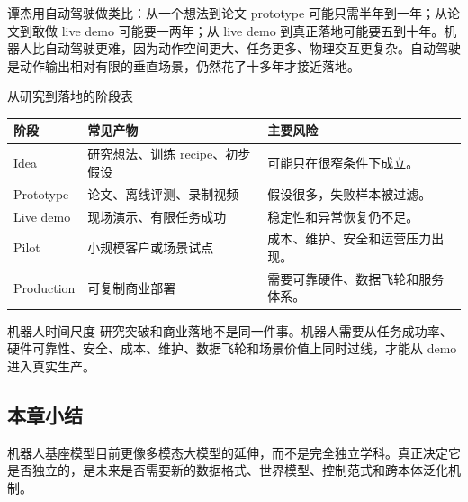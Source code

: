谭杰用自动驾驶做类比：从一个想法到论文 prototype 可能只需半年到一年；从论文到敢做 live demo 可能要一两年；从 live demo 到真正落地可能要五到十年。机器人比自动驾驶更难，因为动作空间更大、任务更多、物理交互更复杂。自动驾驶是动作输出相对有限的垂直场景，仍然花了十多年才接近落地。

\begin{knowledgebox}{从研究到落地的阶段表}
\begin{tabularx}{\textwidth}{p{}p{}X}
\toprule
阶段 & 常见产物 & 主要风险 \\
\midrule
Idea & 研究想法、训练 recipe、初步假设 & 可能只在很窄条件下成立。 \\
Prototype & 论文、离线评测、录制视频 & 假设很多，失败样本被过滤。 \\
Live demo & 现场演示、有限任务成功 & 稳定性和异常恢复仍不足。 \\
Pilot & 小规模客户或场景试点 & 成本、维护、安全和运营压力出现。 \\
Production & 可复制商业部署 & 需要可靠硬件、数据飞轮和服务体系。 \\
\bottomrule
\end{tabularx}
\end{knowledgebox}

\begin{importantbox}{机器人时间尺度}
研究突破和商业落地不是同一件事。机器人需要从任务成功率、硬件可靠性、安全、成本、维护、数据飞轮和场景价值上同时过线，才能从 demo 进入真实生产。
\end{importantbox}

\subsection{本章小结}

机器人基座模型目前更像多模态大模型的延伸，而不是完全独立学科。真正决定它是否独立的，是未来是否需要新的数据格式、世界模型、控制范式和跨本体泛化机制。

